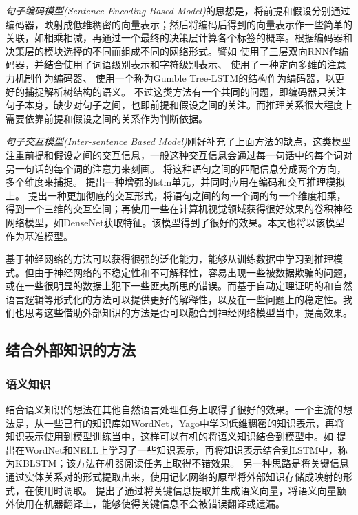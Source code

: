 \documentclass[UTF8,11pt,a4paper,nofonts]{ctexart}
\begin{document}
\textit{句子编码模型(Sentence Encoding Based Model)}\cite{Conneau2017SupervisedLO, Yu2017NeuralSE, Chen2017RecurrentNN, Shen2017DiSAN, Choi2017LearningTC}的思想是，将前提和假设分别通过编码器，映射成低维稠密的向量表示；然后将编码后得到的向量表示作一些简单的关联，如相乘相减，再通过一个最终的决策层计算各个标签的概率。根据编码器和决策层的模块选择的不同而组成不同的网络形式。譬如
\cite{Chen2017RecurrentNN}使用了三层双向RNN作编码器，并结合使用了词语级别表示和字符级别表示、
\cite{Shen2017DiSAN}使用了一种定向多维的注意力机制作为编码器、
\cite{Choi2017LearningTC}使用一个称为Gumble Tree-LSTM的结构作为编码器，以更好的捕捉解析树结构的语义。
不过这类方法有一个共同的问题，即编码器只关注句子本身，缺少对句子之间，也即前提和假设之间的关注。而推理关系很大程度上需要依靠前提和假设之间的关系作为判断依据。


\textit{句子交互模型(Inter-sentence Based Model)}\cite{Wang2017Bilateral, Sha2016ReadingAT, chen2017enhanced, yichen2018nli}刚好补充了上面方法的缺点，这类模型注重前提和假设之间的交互信息，一般这种交互信息会通过每一句话中的每个词对另一句话的每个词的注意力来刻画。
\cite{Wang2017Bilateral}将这种语句之间的匹配信息分成两个方向，多个维度来捕捉。
\cite{chen2017enhanced}提出一种增强的lstm单元，并同时应用在编码和交互推理模拟上。
\cite{yichen2018nli}提出一种更加彻底的交互形式，将语句之间的每一个词的每一个维度相乘，得到一个三维的交互空间；再使用一些在计算机视觉领域获得很好效果的卷积神经网络模型，如DenseNet\cite{Huang2017DenselyCC}获取特征。该模型得到了很好的效果。本文也将以该模型作为基准模型。

基于神经网络的方法可以获得很强的泛化能力，能够从训练数据中学习到推理模式。但由于神经网络的不稳定性和不可解释性，容易出现一些被数据欺骗的问题，或在一些很明显的数据上犯下一些匪夷所思的错误。而基于自动定理证明的和自然语言逻辑等形式化的方法可以提供更好的解释性，以及在一些问题上的稳定性。我们也思考这些借助外部知识的方法是否可以融合到神经网络模型当中，提高效果。




\subsection{结合外部知识的方法}

\subsubsection{语义知识}

结合语义知识的想法在其他自然语言处理任务上取得了很好的效果。一个主流的想法是，从一些已有的知识库如WordNet，Yago中学习低维稠密的知识表示，再将知识表示使用到模型训练当中，这样可以有机的将语义知识结合到模型中。如
\cite{Yang2017LeveragingKB}提出在WordNet和NELL上学习了一些知识表示，再将知识表示结合到LSTM中，称为KBLSTM；该方法在机器阅读任务上取得不错效果。
另一种思路是将关键信息通过实体关系对的形式提取出来，使用记忆网络的原型将外部知识存储成映射的形式，在使用时调取。
\cite{Shi2016KnowledgeBasedSE}提出了通过将关键信息提取并生成语义向量，将语义向量额外使用在机器翻译上，能够使得关键信息不会被错误翻译或遗漏。
\end{document}
